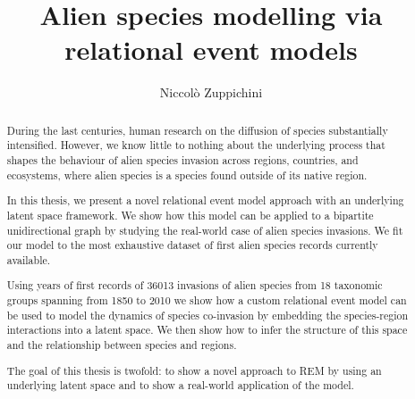 \documentclass[mscthesis]{usiinfthesis}
\title{Alien species modelling via relational event models} %
\author{Niccol\`o Zuppichini} %
\begin{document}
\maketitle %
\frontmatter %

\begin{abstract}
\newcommand\numberevents{36013 } %

During the last centuries, human research on the diffusion of species substantially intensified. However, we know little to nothing about the underlying process that shapes the behaviour of alien species invasion across regions, countries, and ecosystems, where alien species is a species found outside of its native region.

In this thesis, we present a novel relational event model approach with an underlying latent space framework. We show how this model can be applied to a bipartite unidirectional graph by studying the real-world case of alien species invasions. We fit our model to the most exhaustive dataset of first alien species records currently available.

Using years of first records of 36013 invasions of alien species from 18 taxonomic groups spanning from 1850 to 2010 we show how a custom relational event model can be used to model the dynamics of species co-invasion by embedding the species-region interactions into a latent space. We then show how to infer the structure of this space and the relationship between species and regions. 


The goal of this thesis is twofold: to show a novel approach to REM by using an underlying latent space and to show a real-world application of the model.


\end{abstract}



\mainmatter
\end{document}
